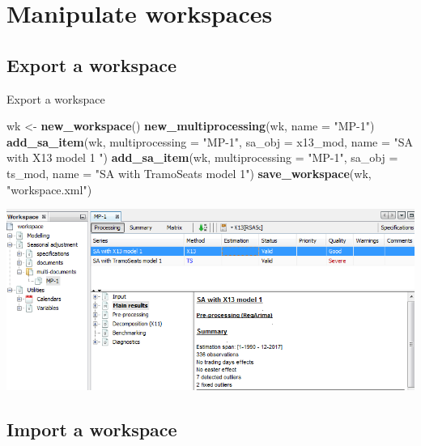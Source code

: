 \documentclass[10pt,xcolor=table,color={dvipsnames,usenames},ignorenonframetext,usepdftitle=false,french]{beamer}
\newenvironment{Shaded}{\begin{snugshade}}{\end{snugshade}}
\newcommand{\DataTypeTok}[1]{\textcolor[rgb]{0.13,0.29,0.53}{#1}}
\newcommand{\KeywordTok}[1]{\textcolor[rgb]{0.13,0.29,0.53}{\textbf{#1}}}
\newcommand{\NormalTok}[1]{#1}
\newcommand{\StringTok}[1]{\textcolor[rgb]{0.31,0.60,0.02}{#1}}
\begin{document}
\hypertarget{manipulate-workspaces}{%
\section{Manipulate workspaces}\label{manipulate-workspaces}}

\hypertarget{export-a-workspace}{%
\subsection{Export a workspace}\label{export-a-workspace}}

\begin{frame}[fragile]{Export a workspace}
\protect\hypertarget{export-a-workspace-1}{}

\footnotesize

\begin{Shaded}
\begin{Highlighting}[]
\NormalTok{wk <-}\StringTok{ }\KeywordTok{new_workspace}\NormalTok{()}
\KeywordTok{new_multiprocessing}\NormalTok{(wk, }\DataTypeTok{name =} \StringTok{"MP-1"}\NormalTok{)}
\KeywordTok{add_sa_item}\NormalTok{(wk, }\DataTypeTok{multiprocessing =} \StringTok{"MP-1"}\NormalTok{,}
            \DataTypeTok{sa_obj =}\NormalTok{ x13_mod, }\DataTypeTok{name =}  \StringTok{"SA with X13 model 1 "}\NormalTok{)}
\KeywordTok{add_sa_item}\NormalTok{(wk, }\DataTypeTok{multiprocessing =}  \StringTok{"MP-1"}\NormalTok{,}
            \DataTypeTok{sa_obj =}\NormalTok{ ts_mod, }\DataTypeTok{name =} \StringTok{"SA with TramoSeats model 1"}\NormalTok{)}
\KeywordTok{save_workspace}\NormalTok{(wk, }\StringTok{"workspace.xml"}\NormalTok{)}
\end{Highlighting}
\end{Shaded}

\includegraphics{img/workspace.png}

\end{frame}

\hypertarget{import-a-workspace}{%
\subsection{Import a workspace}\label{import-a-workspace}}
\end{document}
